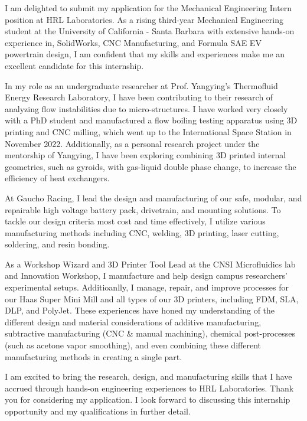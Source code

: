 \documentclass[11pt, letterpaper]{awesome-cv} %
\begin{document}
\makecvheader %

\makelettertitle %


\begin{cvletter}


I am delighted to submit my application for the Mechanical Engineering Intern position at HRL Laboratories. As a rising third-year Mechanical Engineering student at the University of California - Santa Barbara with extensive hands-on experience in, SolidWorks, CNC Manufacturing, and Formula SAE EV powertrain design,  I am confident that my skills and experiences make me an excellent candidate for this internship.

In my role as an undergraduate researcher at Prof. Yangying's Thermofluid Energy Research Laboratory, I have been contributing to their research of analyzing flow instabilities due to micro-structures. I have worked very closely with a PhD student and manufactured a flow boiling testing apparatus using 3D printing and CNC milling, which went up to the International Space Station in November 2022. Additionally, as a personal research project under the mentorship of Yangying, I have been exploring combining 3D printed internal geometries, such as gyroids, with gas-liquid double phase change, to increase the efficiency of heat exchangers. 

At Gaucho Racing, I lead the design and manufacturing of our safe, modular, and repairable high voltage battery pack, drivetrain, and mounting solutions. To tackle our design criteria most cost and time effectively, I utilize various manufacturing methods including CNC, welding, 3D printing, laser cutting, soldering, and resin bonding. 

As a Workshop Wizard and 3D Printer Tool Lead at the CNSI Microfluidics lab and Innovation Workshop, I manufacture and help design campus researchers' experimental setups. Additioanlly, I manage, repair, and improve processes for our Haas Super Mini Mill and all types of our 3D printers, including FDM, SLA, DLP, and PolyJet. These experiences have honed my understanding of the different design and material considerations of additive manufacturing, subtractive manufacturing (CNC \& manual machining), chemical post-processes (such as acetone vapor smoothing), and even combining these different manufacturing methods in creating a single part.

I am excited to bring the research, design, and manufacturing skills that I have accrued through hands-on engineering experiences to HRL Laboratories. Thank you for considering my application. I look forward to discussing this internship opportunity and my qualifications in further detail.


\end{cvletter}


\makeletterclosing %
\end{document}
